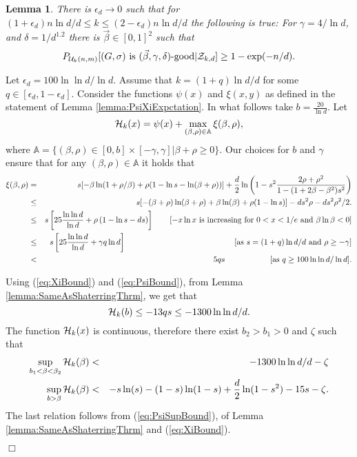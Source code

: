 \documentclass[a4paper,10pt]{article}
\makeatletter
\newtheorem{lemma}{Lemma}\renewcommand{\thelemma}{\arabic{lemma}}
\newenvironment{proof}{\noindent{\bf Proof\@:}}{\hfill $\Box$\\}
\newcommand\cZ{\mathcal{Z}}
\makeatother
\begin{document}
\begin{lemma}
There  is $\epsilon_d\to 0$ such that for $(1+\epsilon_d)n\ln d/d \leq k
\leq (2-\epsilon_d)n\ln d/d$ the following is true: For $\gamma=4/\ln d$,
and $\delta=1/d^{1.2}$ 
there is $\vec{\beta}\in [0,1]^2$ such that
\begin{displaymath}
P_{{\cal U}_k(n,m)}[(G,\sigma) \textrm{ is $(\vec{\beta},\gamma,\delta)$-good}|
\cZ_{k,d}]\geq 1-\exp(-n/d).
\end{displaymath}
\end{lemma}
\begin{proof}
Let $\epsilon_d=100\ln\ln d/\ln d$. Assume that $k=(1+q)\ln d/d$ for some
$q\in [\epsilon_d,1-\epsilon_d]$. Consider the functions $\psi(x)$ 
and $\xi(x,y)$ as defined in the statement of Lemma
\ref{lemma:PsiXiExpctation}. 
In what follows take $b=\frac{20}{\ln d}$. Let 
$${\cal H}_k(x)=\psi(x)+\max_{(\beta,\rho)\in \mathbb{A}} \xi(\beta,\rho),$$
where $\mathbb{A}=\{(\beta,\rho)\in [0,b]\times [-\gamma,\gamma]|\beta+\rho\geq 0\}$.
Our choices for $b$ and $\gamma$ ensure that for any
$(\beta,\rho)\in \mathbb{A}$ it holds that
\begin{eqnarray}
\xi (\beta,\rho)&=& 
s[-\beta \ln(1+\rho/\beta) +\rho(1-\ln s-\ln(\beta+\rho))]+
\frac{d}{2}\ln \left(1-s^2\frac{2\rho+\rho^2}{1-(1+2\beta-\beta^2)s^2}\right)
\nonumber  
\\
&\leq& 
s[-(\beta+\rho) \ln(\beta+\rho)+\beta\ln(\beta) +\rho(1-\ln s)]-
ds^2\rho-ds^2\rho^2/2.
\nonumber  
\\
&\leq& 
s\left[25\frac{\ln\ln d}{\ln d}+\rho\left(1-\ln s -ds\right)\right]
\qquad\mbox{[$-x\ln x$ is increasing for $0<x<1/e$ and $\beta\ln \beta <0$]}
\nonumber  
\\
&\leq& 
s\left[25\frac{\ln\ln d}{\ln d} +\gamma q\ln d \right]  
\hspace*{4.8cm} \mbox{[as $s=(1+q)\ln d/d$ and $\rho\geq -\gamma $]} \nonumber \\
&<& {5}qs \hspace*{2cm}\mbox{[as $q\geq 100\ln\ln d/\ln d$].}   \label{eq:XiBound}
\end{eqnarray}

\noindent
Using (\ref{eq:XiBound}) and (\ref{eq:PsiBound}), from Lemma \ref{lemma:SameAsShaterringThrm},
we get that 
\begin{equation}\label{eq:HbUBound}
{\cal H}_k(b)\leq -13qs\leq -1300\ln\ln d/d.
\end{equation}
The function ${\cal H}_k(x)$ is continuous, therefore there exist $b_2>b_1>0$ 
and $\zeta$ such that
\begin{eqnarray}
\sup_{b_1<\beta<\beta_2}{\cal H}_k(\beta)&<&-1300\ln\ln d/d-\zeta \nonumber
\\
\sup_{b>\beta}{\cal H}_k(\beta)&<&-s\ln(s)-(1-s)\ln(1-s)+\frac{d}2\ln(1-s^2)-15s-\zeta.
\nonumber
\end{eqnarray}
The last relation follows from (\ref{eq:PsiSupBound}), of Lemma \ref{lemma:SameAsShaterringThrm}
and (\ref{eq:XiBound}).


\end{proof}
\end{document}
